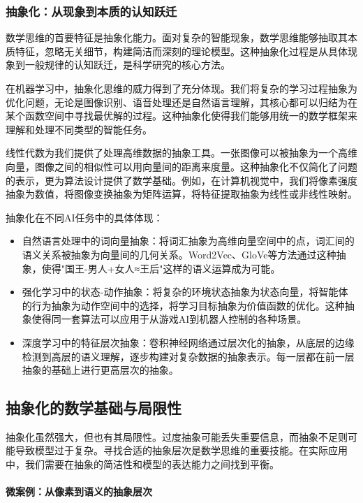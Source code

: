 \subsubsection{抽象化：从现象到本质的认知跃迁}

数学思维的首要特征是抽象化能力。面对复杂的智能现象，数学思维能够抽取其本质特征，忽略无关细节，构建简洁而深刻的理论模型。这种抽象化过程是从具体现象到一般规律的认知跃迁，是科学研究的核心方法。

在机器学习中，抽象化思维的威力得到了充分体现。我们将复杂的学习过程抽象为优化问题，无论是图像识别、语音处理还是自然语言理解，其核心都可以归结为在某个函数空间中寻找最优解的过程。这种抽象化使得我们能够用统一的数学框架来理解和处理不同类型的智能任务。

线性代数为我们提供了处理高维数据的抽象工具。一张图像可以被抽象为一个高维向量，图像之间的相似性可以用向量间的距离来度量。这种抽象化不仅简化了问题的表示，更为算法设计提供了数学基础。例如，在计算机视觉中，我们将像素强度抽象为数值，将图像变换抽象为矩阵运算，将特征提取抽象为线性或非线性映射。

抽象化在不同AI任务中的具体体现：

\begin{itemize}
\item 自然语言处理中的词向量抽象：将词汇抽象为高维向量空间中的点，词汇间的语义关系被抽象为向量间的几何关系。Word2Vec、GloVe等方法通过这种抽象，使得"国王-男人+女人≈王后"这样的语义运算成为可能。
\item 强化学习中的状态-动作抽象：将复杂的环境状态抽象为状态向量，将智能体的行为抽象为动作空间中的选择，将学习目标抽象为价值函数的优化。这种抽象使得同一套算法可以应用于从游戏AI到机器人控制的各种场景。
\item 深度学习中的特征层次抽象：卷积神经网络通过层次化的抽象，从底层的边缘检测到高层的语义理解，逐步构建对复杂数据的抽象表示。每一层都在前一层抽象的基础上进行更高层次的抽象。
\end{itemize}

\subsection*{抽象化的数学基础与局限性}

抽象化虽然强大，但也有其局限性。过度抽象可能丢失重要信息，而抽象不足则可能导致模型过于复杂。寻找合适的抽象层次是数学思维的重要技能。在实际应用中，我们需要在抽象的简洁性和模型的表达能力之间找到平衡。

\paragraph{微案例：从像素到语义的抽象层次}

